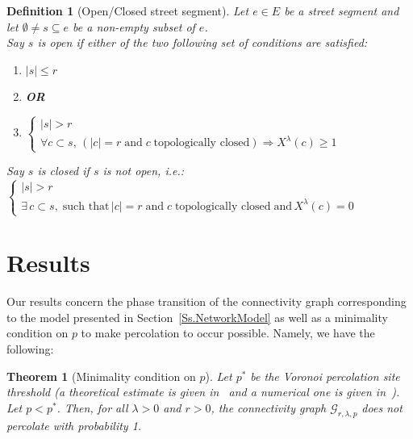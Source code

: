 \documentclass[10pt,a4paper]{amsart}
\theoremstyle{exampstyle}
\newtheorem{Theorem}{Theorem}
\newtheorem{Definition}{Definition}
\theoremstyle{exampnotations}
\begin{document}
\begin{Definition}[Open/Closed street segment]
\label{Def.open/closed/subcritical}
Let $e \in E$ be a street segment and let $\emptyset \neq s \subseteq e$ be a non-empty subset of $e$.\\ Say $s$ is \emph{open} if either of the two following set of conditions are satisfied:
\begin{enumerate}
\item $\vert s \vert \leq r$
\vspace{.2 cm}
\item[]\textbf{OR}
\vspace{.2 cm}
\item $\left\{
\begin{array}{l}
\vert s \vert > r \\
\forall c \subset s, \, (\vert c \vert = r \; \text{and} \; c  \; \text{topologically closed} )\Rightarrow X^{\lambda}(c) \geq 1
\end{array}
\right.$
\end{enumerate}
Say $s$ is \emph{closed} if $s$ is not open, i.e.: \\
 $\left\{
\begin{array}{l}
\vert s \vert > r \\
\exists \, c \subset s, \; \text{such that} \, \vert c \vert = r \; \text{and} \; c  \; \text{topologically closed} \; \text{and} \,  X^{\lambda}(c) = 0
\end{array}
\right.$
\end{Definition}

\section{Results}
Our results concern the phase transition of the connectivity graph corresponding to the model presented in Section~\ref{Ss.NetworkModel} as well as a minimality condition on $p$ to make percolation to occur possible. Namely, we have the following:

\begin{Theorem}[Minimality condition on $p$]
\label{Thm.minimality}
Let $p^{*}$ be the Voronoi percolation site threshold (a theoretical estimate is given in~\cite{neher2008topological} and a numerical one is given in~\cite{becker_percolation_2009}). Let $p < p^*$. Then, for all $\lambda > 0$ and $r >0$, the connectivity graph $\mathcal{G}_{r, \lambda, p}$ does not percolate with probability 1.
\end{Theorem}
\end{document}
